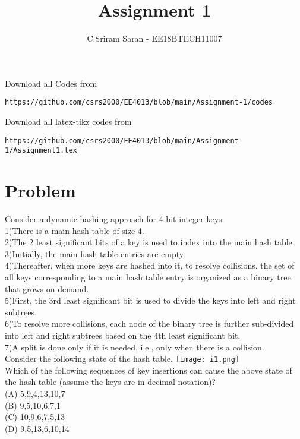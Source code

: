 \documentclass[journal,12pt,twocolumn]{IEEEtran}
\begin{document}
     \def\rightbox#1{\makebox[0in][r]{#1}}
     \def\centbox#1{\makebox[0in]{#1}}
     \def\topbox#1{\raisebox{-\baselineskip}[0in][0in]{#1}}
     \def\midbox#1{\raisebox{-0.5\baselineskip}[0in][0in]{#1}}
\vspace{3cm}
\title{Assignment 1}
\author{C.Sriram Saran - EE18BTECH11007}
\maketitle
\newpage
\bigskip
\renewcommand{\thefigure}{\theenumi}
\renewcommand{\thetable}{\theenumi}
Download all Codes from 
%
\begin{lstlisting}
https://github.com/csrs2000/EE4013/blob/main/Assignment-1/codes
\end{lstlisting}
Download all latex-tikz codes from 

\begin{lstlisting}
https://github.com/csrs2000/EE4013/blob/main/Assignment-1/Assignment1.tex
\end{lstlisting}
\section{Problem}
Consider a dynamic hashing approach for 4-bit integer keys:\\
1)There is a main hash table of size 4.\\
2)The 2 least significant bits of a key is used to index into the main hash table.\\
3)Initially, the main hash table entries are empty.\\
4)Thereafter, when more keys are hashed into it, to resolve collisions, the set of all keys corresponding to a main hash table entry is organized as a binary tree that grows on demand.\\
5)First, the 3rd least significant bit is used to divide the keys into left and right subtrees.\\
6)To resolve more collisions, each node of the binary tree is further sub-divided into left and right subtrees based on the 4th least significant bit.\\
7)A split is done only if it is needed, i.e., only when there is a collision.\\
Consider the following state of the hash table.
\texttt{[image: i1.png]}\\
Which of the following sequences of key insertions can cause the above state of the hash table (assume the keys are in decimal notation)?\\
(A) 5,9,4,13,10,7\\
(B) 9,5,10,6,7,1\\
(C) 10,9,6,7,5,13\\
(D) 9,5,13,6,10,14\\
\end{document}
